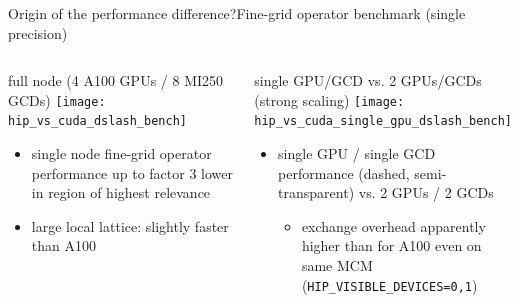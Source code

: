 \documentclass[xcolor={dvipsnames,table}]{beamer}
\begin{document}
\begin{frame}{Origin of the performance difference?}{Fine-grid operator benchmark (single precision)}
  \begin{columns}
      \begin{hpcablock}{full node (4 A100 GPUs / 8 MI250 GCDs)}
        \texttt{[image: hip\_vs\_cuda\_dslash\_bench]} \\
        \begin{itemize}
          \item single node fine-grid operator performance up to factor 3 lower in region of highest relevance
          \item large local lattice: slightly faster than A100
        \end{itemize}    
      \end{hpcablock}
      \begin{hpcablock}{single GPU/GCD vs. 2 GPUs/GCDs (strong scaling)}
        \texttt{[image: hip\_vs\_cuda\_single\_gpu\_dslash\_bench]} \\  
        \begin{itemize}
          \item single GPU / single GCD performance (dashed, semi-transparent) vs. 2 GPUs / 2 GCDs
            \begin{itemize}
              \item exchange overhead apparently higher than for A100 even on same MCM (\texttt{HIP\_VISIBLE\_DEVICES=0,1})
            \end{itemize}
        \end{itemize}    
      \end{hpcablock}  
  \end{columns}

\end{frame}
\end{document}
